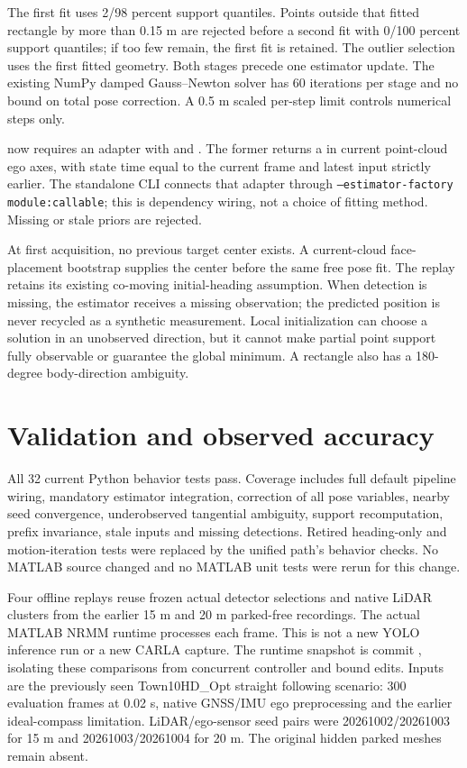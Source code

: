 \documentclass[11pt]{article}
\begin{document}
The first fit uses 2/98 percent support quantiles. Points outside that fitted
rectangle by more than 0.15 m are rejected before a second fit with 0/100
percent support quantiles; if too few remain, the first fit is retained.
The outlier selection uses the first fitted geometry. Both stages precede
one estimator update. The existing NumPy damped Gauss--Newton solver has
60 iterations per stage and no bound on total pose correction. A 0.5 m
scaled per-step limit controls numerical steps only.

 now requires an adapter with
 and .
The former returns a  in current point-cloud ego axes, with
state time equal to the current frame and latest input strictly earlier.
The standalone CLI connects that adapter through
\texttt{--estimator-factory module:callable}; this is dependency wiring,
not a choice of fitting method. Missing or stale priors are rejected.

At first acquisition, no previous target center exists. A current-cloud
face-placement bootstrap supplies the center before the same free pose fit.
The replay retains its existing co-moving initial-heading assumption.
When detection is missing, the estimator receives a missing observation;
the predicted position is never recycled as a synthetic measurement.
Local initialization can choose a solution in an unobserved direction,
but it cannot make partial point support fully observable or guarantee the
global minimum. A rectangle also has a 180-degree body-direction ambiguity.

\section{Validation and observed accuracy}
All 32 current Python behavior tests pass. Coverage includes full default
pipeline wiring, mandatory estimator integration, correction of all pose
variables, nearby seed convergence, underobserved tangential ambiguity,
support recomputation, prefix invariance, stale inputs and missing detections.
Retired heading-only and motion-iteration tests were replaced by the unified
path's behavior checks. No MATLAB source changed and no MATLAB unit tests
were rerun for this change.

Four offline replays reuse frozen actual detector selections and native LiDAR
clusters from the earlier 15 m and 20 m parked-free recordings. The actual
MATLAB NRMM runtime processes each frame. This is not a new YOLO inference
run or a new CARLA capture. The runtime snapshot is commit
, isolating these comparisons
from concurrent controller and bound edits. Inputs are the previously seen
Town10HD\_Opt straight following scenario: 300 evaluation frames at 0.02 s,
native GNSS/IMU ego preprocessing and the earlier ideal-compass limitation.
LiDAR/ego-sensor seed pairs were 20261002/20261003 for 15 m and
20261003/20261004 for 20 m. The original hidden parked meshes remain absent.
\end{document}
